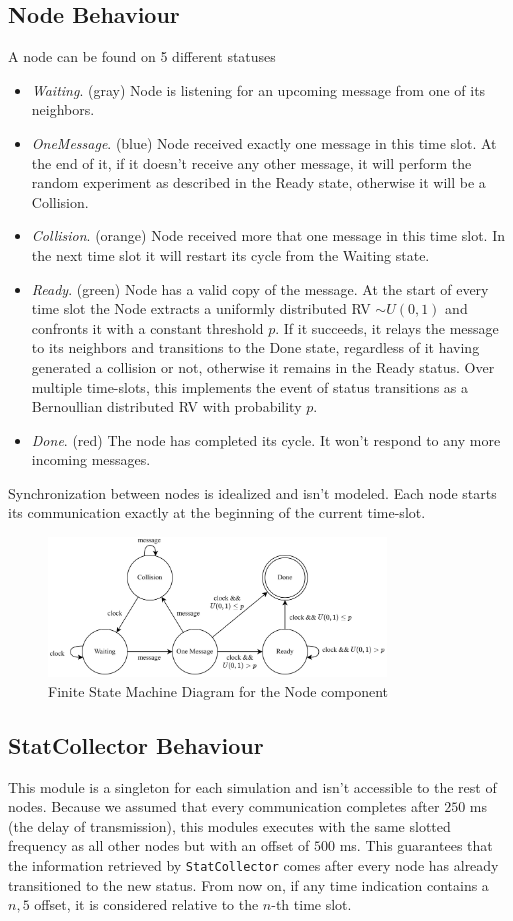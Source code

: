 \subsection{Node Behaviour}
A node can be found on 5 different statuses
\begin{itemize}
\item \textit{Waiting}. (gray) Node is listening for an upcoming message from one of its neighbors.
\item \textit{OneMessage}. (blue) Node received exactly one message in this time slot. At the end of it, if it doesn't receive any other message, it will perform the random experiment as described in the Ready state, otherwise it will be a Collision.
\item \textit{Collision}. (orange) Node received more that one message in this time slot. In the next time slot it will restart its cycle from the Waiting state.
\item \textit{Ready}. (green) Node has a valid copy of the message. At the start of every time slot the Node extracts a uniformly distributed RV $\sim U(0,1)$ and confronts it with a constant threshold $p$. If it succeeds, it relays the message to its neighbors and transitions to the Done state, regardless of it having generated a collision or not, otherwise it remains in the Ready status. Over multiple time-slots, this implements the event of status transitions as a Bernoullian distributed RV with probability $p$.
\item \textit{Done}. (red) The node has completed its cycle. It won't respond to any more incoming messages. 
\end{itemize}
Synchronization between nodes is idealized and isn't modeled. Each node starts its communication exactly at the beginning of the current time-slot.

\begin{figure}
\centering
\includegraphics[width=0.8\textwidth]{./images/fsm.png}
\caption{Finite State Machine Diagram for the Node component}
\label{fig:fsm}
\end{figure}
\subsection{StatCollector Behaviour}
This module is a singleton for each simulation and isn't accessible to the rest of nodes. Because we assumed that every communication completes after $250$ ms (the delay of transmission), this modules executes with the same slotted frequency as all other nodes but with an offset of $500$ ms. This guarantees that the information retrieved by \texttt{StatCollector} comes after every node has already transitioned to the new status. From now on, if any time indication contains a $n,5$ offset, it is considered relative to the $n$-th time slot.

